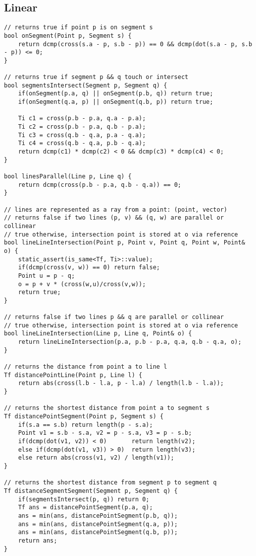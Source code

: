 \documentclass[FSZ,a4paper,onesided]{article}
\begin{document}
\begin{multicols*}{\COLS}
\subsection{Linear}
\begin{lstlisting}
// returns true if point p is on segment s
bool onSegment(Point p, Segment s) {
    return dcmp(cross(s.a - p, s.b - p)) == 0 && dcmp(dot(s.a - p, s.b - p)) <= 0;
}

// returns true if segment p && q touch or intersect
bool segmentsIntersect(Segment p, Segment q) {
    if(onSegment(p.a, q) || onSegment(p.b, q)) return true;
    if(onSegment(q.a, p) || onSegment(q.b, p)) return true;

    Ti c1 = cross(p.b - p.a, q.a - p.a);
    Ti c2 = cross(p.b - p.a, q.b - p.a);
    Ti c3 = cross(q.b - q.a, p.a - q.a);
    Ti c4 = cross(q.b - q.a, p.b - q.a);
    return dcmp(c1) * dcmp(c2) < 0 && dcmp(c3) * dcmp(c4) < 0;
}

bool linesParallel(Line p, Line q) {
    return dcmp(cross(p.b - p.a, q.b - q.a)) == 0;
}

// lines are represented as a ray from a point: (point, vector)
// returns false if two lines (p, v) && (q, w) are parallel or collinear
// true otherwise, intersection point is stored at o via reference
bool lineLineIntersection(Point p, Point v, Point q, Point w, Point& o) {
    static_assert(is_same<Tf, Ti>::value);
    if(dcmp(cross(v, w)) == 0) return false;
    Point u = p - q;
    o = p + v * (cross(w,u)/cross(v,w));
    return true;
}

// returns false if two lines p && q are parallel or collinear
// true otherwise, intersection point is stored at o via reference
bool lineLineIntersection(Line p, Line q, Point& o) {
    return lineLineIntersection(p.a, p.b - p.a, q.a, q.b - q.a, o);
}

// returns the distance from point a to line l
Tf distancePointLine(Point p, Line l) {
    return abs(cross(l.b - l.a, p - l.a) / length(l.b - l.a));
}

// returns the shortest distance from point a to segment s
Tf distancePointSegment(Point p, Segment s) {
    if(s.a == s.b) return length(p - s.a);
    Point v1 = s.b - s.a, v2 = p - s.a, v3 = p - s.b;
    if(dcmp(dot(v1, v2)) < 0)       return length(v2);
    else if(dcmp(dot(v1, v3)) > 0)  return length(v3);
    else return abs(cross(v1, v2) / length(v1));
}

// returns the shortest distance from segment p to segment q
Tf distanceSegmentSegment(Segment p, Segment q) {
    if(segmentsIntersect(p, q)) return 0;
    Tf ans = distancePointSegment(p.a, q);
    ans = min(ans, distancePointSegment(p.b, q));
    ans = min(ans, distancePointSegment(q.a, p));
    ans = min(ans, distancePointSegment(q.b, p));
    return ans;
}


\end{lstlisting}
\end{multicols*}
\end{document}
